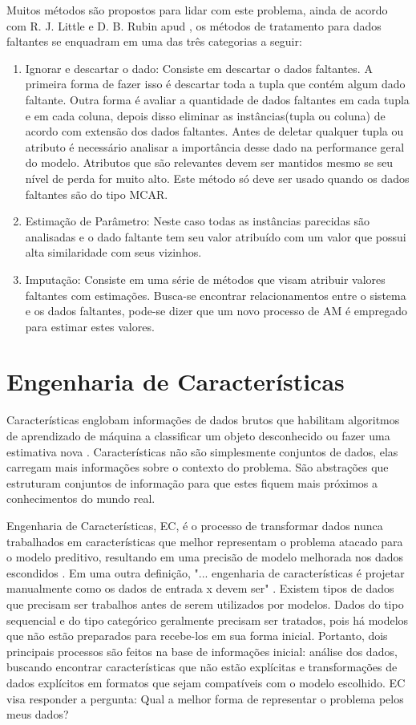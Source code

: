 Muitos métodos são propostos para lidar com este problema, ainda de acordo com  R. J. Little e D. B. Rubin apud , os métodos de tratamento para dados faltantes se enquadram em uma das três categorias a seguir:

\begin{enumerate}
\item Ignorar e descartar o dado: Consiste em descartar o dados faltantes. A primeira forma de fazer isso é descartar toda a tupla que contém algum dado faltante. Outra forma é avaliar a quantidade de dados faltantes em cada tupla e em cada coluna, depois disso eliminar as instâncias(tupla ou coluna) de acordo com extensão dos dados faltantes. Antes de deletar qualquer tupla ou atributo é necessário analisar a importância desse dado na performance geral do modelo. Atributos que são relevantes devem ser mantidos mesmo se seu nível de perda for muito alto. Este método só deve ser usado quando os dados faltantes são do tipo MCAR.
\item Estimação de Parâmetro: Neste caso todas as instâncias parecidas são analisadas e o dado faltante tem seu valor atribuído com um valor que possui alta similaridade com seus vizinhos.
\item Imputação: Consiste em uma série de métodos que visam atribuir valores faltantes com estimações. Busca-se encontrar relacionamentos entre o sistema e os dados faltantes, pode-se dizer que um novo processo de AM é empregado para estimar estes valores.
\end{enumerate}


\section{Engenharia de Características}

Características englobam informações de dados brutos que habilitam algoritmos de aprendizado de máquina a classificar um objeto desconhecido ou fazer uma estimativa nova \cite{brain2013}. Características não são simplesmente conjuntos de dados, elas carregam mais informações sobre o contexto do problema. São abstrações que estruturam conjuntos de informação para que estes fiquem mais próximos a conhecimentos do mundo real.   

Engenharia de Características, EC, é o processo de transformar dados nunca trabalhados em características que melhor representam o problema atacado para o modelo preditivo, resultando em uma precisão de modelo melhorada nos dados escondidos \cite{fe2014}. Em uma outra definição, "... engenharia de características é projetar manualmente como os dados de entrada x devem ser" \cite{tomas2014}. Existem tipos de dados que precisam ser trabalhos antes de serem utilizados por modelos. Dados do tipo sequencial e do tipo categórico geralmente precisam ser tratados, pois há modelos que não estão preparados para recebe-los em sua forma inicial. Portanto, dois principais processos são feitos na base de informações inicial: análise dos dados, buscando encontrar características que não estão explícitas e transformações de dados explícitos em formatos que sejam compatíveis com o modelo escolhido. EC visa responder a pergunta: Qual a melhor forma de representar o problema pelos meus dados?

